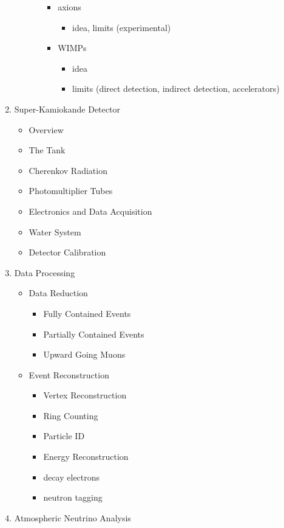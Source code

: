\documentclass[12pt,oneside,openright]{article}
\begin{document}
\begin{enumerate}
\begin{itemize}
\begin{itemize}
\begin{itemize}
\begin{itemize}
				\end{itemize}
			\item axions
				\begin{itemize}
				\item idea, limits (experimental)
				\end{itemize}
			\item WIMPs
				\begin{itemize}
				\item idea
				\item limits (direct detection, indirect detection, accelerators)
				\end{itemize}
			\end{itemize}
		\end{itemize}
	\end{itemize}
\item Super-Kamiokande Detector
	\begin{itemize}
	\item Overview
	\item The Tank
	\item Cherenkov Radiation
	\item Photomultiplier Tubes
	\item Electronics and Data Acquisition
  	\item Water System
	\item Detector Calibration
	\end{itemize}
\item Data Processing
	\begin{itemize}
	\item Data Reduction
		\begin{itemize}
		\item Fully Contained Events
		\item Partially Contained Events
		\item Upward Going Muons
		\end{itemize}
	\item Event Reconstruction
		\begin{itemize}
		\item Vertex Reconstruction
		\item Ring Counting
		\item Particle ID
		\item Energy Reconstruction
		\item decay electrons
		\item neutron tagging
		\end{itemize}
	\end{itemize} 
\item Atmospheric Neutrino Analysis

\end{enumerate}
\end{document}
